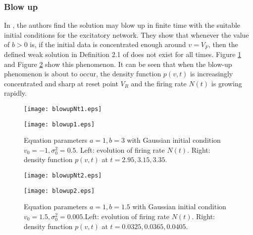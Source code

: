 \subsubsection{Blow up}


In \cite{caceres2011analysis}, the authors find the solution may blow up in finite time with the suitable initial conditions for the excitatory network. They show that whenever the value of $b>0$ is, if the initial data is concentrated enough around $v=V_F$, then the defined weak solution in Definition 2.1 of \cite{caceres2011analysis} does not exist for all times. Figure \ref{fig:blowup1} and Figure \ref{fig:blowup2} show this phenomenon. It can be seen that when the blow-up phenomenon is about to occur, the density function $p(v,t)$ is increasingly concentrated and sharp at reset point $V_R$ and the firing rate $N(t)$ is growing rapidly. 
\begin{figure}[!htb]
    \centering
        \begin{minipage}[c]{0.49\textwidth}
            \centering
            \texttt{[image: blowupNt1.eps]}
        \end{minipage}
        \begin{minipage}[c]{0.49\textwidth}
            \centering
            \texttt{[image: blowup1.eps]}
        \end{minipage}
        \caption{Equation parameters $a=1, b=3$ with Gaussian initial condition $v_0=-1, \sigma_0^2=0.5$. Left: evolution of firing rate $N(t)$. Right: density function $p(v, t)$ at $t=2.95,3.15,3.35$.}
        \label{fig:blowup1}
\end{figure}
\begin{figure}[!htb]
        \begin{minipage}[c]{0.49\textwidth}
            \centering
            \texttt{[image: blowupNt2.eps]}
        \end{minipage}
        \begin{minipage}[c]{0.49\textwidth}
            \centering
            \texttt{[image: blowup2.eps]}
        \end{minipage}
        \caption{Equation parameters $a=1, b=1.5$ with Gaussian initial condition $v_0=1.5, \sigma_0^2=0.005$.Left: evolution of firing rate $N(t)$. Right: density function $p(v, t)$ at $t=0.0325,0.0365,0.0405$.}
        \label{fig:blowup2}
\end{figure}


